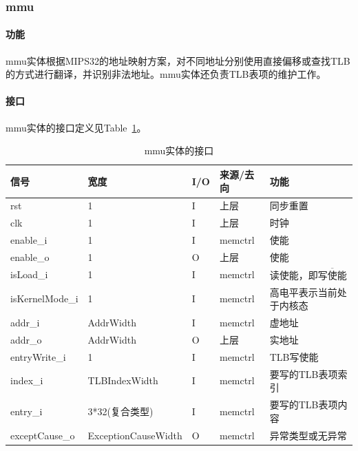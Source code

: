 \documentclass{article}
\begin{document}
\begin{spacing}{1.4}
\subsubsection{mmu}

\paragraph{功能}\mbox{}

mmu实体根据MIPS32的地址映射方案，对不同地址分别使用直接偏移或查找TLB的方式进行翻译，并识别非法地址。mmu实体还负责TLB表项的维护工作。

\paragraph{接口}\mbox{}

mmu实体的接口定义见Table~\ref{tb:mmu-interface}。
\begin{table}[!htb]
\begin{center}
\begin{tabular*}{15cm}{l|l|l|l|p{5cm}}
\hline
\textbf{信号}&\textbf{宽度}&\textbf{I/O}&\textbf{来源/去向}&\textbf{功能} \\
\hline rst                     & 1                      & I     & 上层          & 同步重置 \\
\hline clk                     & 1                      & I     & 上层          & 时钟 \\
\hline enable\_i               & 1                      & I     & memctrl       & 使能 \\
\hline enable\_o               & 1                      & O     & 上层          & 使能 \\
\hline isLoad\_i               & 1                      & I     & memctrl       & 读使能，即$\overline{\text{写使能}}$ \\
\hline isKernelMode\_i         & 1                      & I     & memctrl       & 高电平表示当前处于内核态 \\
\hline addr\_i                 & AddrWidth              & I     & memctrl       & 虚地址 \\
\hline addr\_o                 & AddrWidth              & O     & 上层          & 实地址 \\
\hline entryWrite\_i           & 1                      & I     & memctrl       & TLB写使能 \\
\hline index\_i                & TLBIndexWidth          & I     & memctrl       & 要写的TLB表项索引 \\
\hline entry\_i                & 3*32(复合类型)         & I     & memctrl       & 要写的TLB表项内容 \\
\hline exceptCause\_o          & ExceptionCauseWidth    & O     & memctrl       & 异常类型或无异常 \\
\hline
\end{tabular*}
\caption{mmu实体的接口}
\label{tb:mmu-interface}
\end{center}
\end{table}


\end{spacing}
\end{document}
